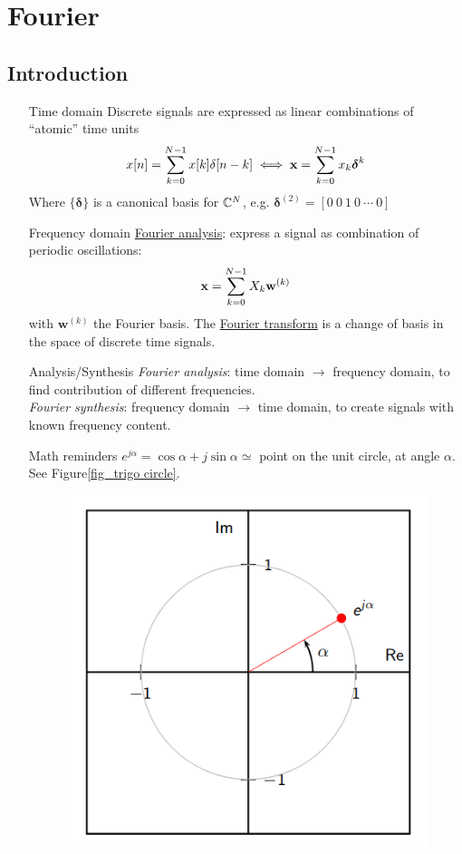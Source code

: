 \documentclass[11pt,a4paper]{article}
\begin{document}
\section{Fourier}
\subsection{Introduction}
\begin{itemize}
    \item[Time domain]Discrete signals are expressed as linear combinations of ``atomic'' time units
    \[x[n] = \somme{N-1}{k=0}x[k]\delta[n-k] \iff \mathbf{x} = \somme{N-1}{k=0}x_k \boldsymbol{\delta}^k\]
    Where $\{\boldsymbol{\delta}\}$ is a canonical basis for $\C^N$, e.g. $\boldsymbol{\delta}^{(2)} = [0\ 0\ 1\ 0\ \cdots\ 0]$
    \item[Frequency domain] \uline{Fourier analysis}: express a signal as combination of periodic oscillations:
        \begin{equation}
            \mathbf{x} = \somme{N-1}{k=0} X_k \mathbf{w}^{(k)}
        \end{equation}
        with $\mathbf{w}^{(k)}$ the Fourier basis. The \uline{Fourier transform} is a change of basis in the space of discrete time signals.
    \item[Analysis/Synthesis] 
        \textit{Fourier analysis}: time domain $\to$ frequency domain, to find contribution of different frequencies.\\
        \textit{Fourier synthesis}: frequency domain $\to$ time domain, to create signals with known frequency content.
    \item[Math reminders] $e^{j\alpha} = \cos\alpha + j\sin\alpha \simeq$ point on the unit circle, at angle $\alpha$. See Figure\ref{fig_trigo circle}.
        \begin{figure}
            \centering
            \includegraphics[scale=0.4]{images/trigo_circle}

\end{figure}
\end{itemize}
\end{document}
